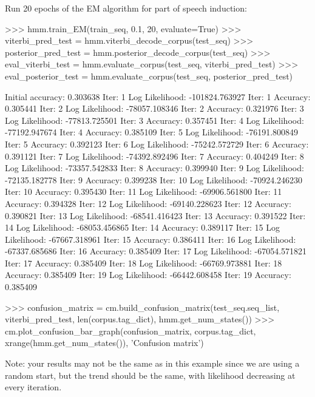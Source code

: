 \begin{exercise}
Run 20 epochs of the EM algorithm for part of speech induction:
\begin{python}
>>> hmm.train_EM(train_seq, 0.1, 20, evaluate=True)
>>> viterbi_pred_test = hmm.viterbi_decode_corpus(test_seq)
>>> posterior_pred_test = hmm.posterior_decode_corpus(test_seq)
>>> eval_viterbi_test =   hmm.evaluate_corpus(test_seq, viterbi_pred_test)
>>> eval_posterior_test = hmm.evaluate_corpus(test_seq, posterior_pred_test)

Initial accuracy: 0.303638
Iter: 1 Log Likelihood: -101824.763927
Iter: 1 Accuracy: 0.305441
Iter: 2 Log Likelihood: -78057.108346
Iter: 2 Accuracy: 0.321976
Iter: 3 Log Likelihood: -77813.725501
Iter: 3 Accuracy: 0.357451
Iter: 4 Log Likelihood: -77192.947674
Iter: 4 Accuracy: 0.385109
Iter: 5 Log Likelihood: -76191.800849
Iter: 5 Accuracy: 0.392123
Iter: 6 Log Likelihood: -75242.572729
Iter: 6 Accuracy: 0.391121
Iter: 7 Log Likelihood: -74392.892496
Iter: 7 Accuracy: 0.404249
Iter: 8 Log Likelihood: -73357.542833
Iter: 8 Accuracy: 0.399940
Iter: 9 Log Likelihood: -72135.182778
Iter: 9 Accuracy: 0.399238
Iter: 10 Log Likelihood: -70924.246230
Iter: 10 Accuracy: 0.395430
Iter: 11 Log Likelihood: -69906.561800
Iter: 11 Accuracy: 0.394328
Iter: 12 Log Likelihood: -69140.228623
Iter: 12 Accuracy: 0.390821
Iter: 13 Log Likelihood: -68541.416423
Iter: 13 Accuracy: 0.391522
Iter: 14 Log Likelihood: -68053.456865
Iter: 14 Accuracy: 0.389117
Iter: 15 Log Likelihood: -67667.318961
Iter: 15 Accuracy: 0.386411
Iter: 16 Log Likelihood: -67337.685686
Iter: 16 Accuracy: 0.385409
Iter: 17 Log Likelihood: -67054.571821
Iter: 17 Accuracy: 0.385409
Iter: 18 Log Likelihood: -66769.973881
Iter: 18 Accuracy: 0.385409
Iter: 19 Log Likelihood: -66442.608458
Iter: 19 Accuracy: 0.385409

>>> confusion_matrix = cm.build_confusion_matrix(test_seq.seq_list, viterbi_pred_test, 
                                             len(corpus.tag_dict), hmm.get_num_states())
>>> cm.plot_confusion_bar_graph(confusion_matrix, corpus.tag_dict, 
                            xrange(hmm.get_num_states()), 'Confusion matrix')
\end{python}
Note: your results may not be the same as in this example since we are using a random start, but the trend should be the same, with likelihood decreasing at every iteration. 
\end{exercise}


